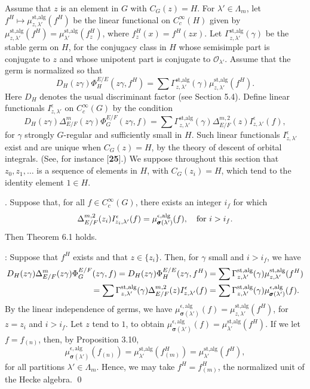\documentclass{amsart}
\begin{document}
Assume that $z$ is an element in $G$ with $C_G(z) = H$.  For $\lambda'\in\Lambda_m$,
let $f^H\mapsto \mu_{z,\lambda'}^{\text{st,alg}}(f^H)$ be the linear
functional on $C_c^\infty(H)$ given by 
	$\mu_{z,\lambda'}^{\text{st,alg}}(f^H)=
\mu_{\lambda'}^{\text{st,alg}}(f^H_z)$, where $f^H_z(x) = f^H(zx)$.
Let $\Gamma^{\text{st,alg}}_{z,\lambda'}(\gamma)$ be the stable germ
on $H$, for the conjugacy class in $H$ whose semisimple part is
conjugate to $z$ and whose unipotent part is conjugate
to ${\mathcal O}_{\lambda'}$.  Assume that the germ is normalized
so that
$$D_H(z\gamma)\Phi^{E/E}_H(z\gamma,f^H) = \sum \Gamma^{\text{st,alg}}_{z,\lambda'}
(\gamma)\mu_{z,\lambda'}^{\text{st,alg}}(f^H).$$
Here $D_H$ denotes the usual discriminant factor (see Section 5.4).
Define linear functionals $I^{\epsilon}_{z,\lambda'}$ on 
$C_c^\infty(G)$ by the condition
$$D_H(z\gamma)\Delta^m_{E/F}(z\gamma)\Phi^{E/F}_G(z\gamma,f) = 
	\sum\Gamma^{\text{st,alg}}_{z,\lambda'}(\gamma)\Delta^{m,2}_{E/F}(z)
	I^{\epsilon}_{z,\lambda'}(f),$$
for $\gamma$ strongly $G$-regular and sufficiently small in $H$.
Such linear functionals $I^{\epsilon}_{z,\lambda'}$ exist
and are unique when $C_G(z) = H$, by the theory of descent of
orbital integrals.  (See, for instance [{\bf 25}].)
We suppose throughout this section that $z_0,z_1,\ldots$ is a sequence
of elements in $H$, with $C_G(z_i) = H$, which tend to the identity
element $1\in H$.  

.  
Suppose that, for all $f\in C_c^\infty (G)$, there exists
an integer $i_f$ for which
$$\Delta^{m,2}_{E/F}(z_i)I^{\epsilon}_{z_i,\lambda'}(f)
	= \mu^{\epsilon,\text{alg}}_{\pmb\sigma(\lambda')}(f),\ \ \text{ for }
	i>i_f.\hss$$
Then Theorem 6.1 holds.
\finishproclaim

:  Suppose that $f^H$ exists and that $z\in \{z_i\}$.
Then, for $\gamma$ small and $i>i_f$, we have
\begin{align*}
D_H(z\gamma)\Delta^m_{E/F}(z\gamma)\Phi^{E/F}_G(z\gamma,f) =
	D_H(z\gamma)\Phi^{E/E}_H(z\gamma,f^H) &= 
 	\sum\Gamma^{\text{st,alg}}_{z,\lambda'}(\gamma)\mu^{\text{st,alg}}_
	{z,\lambda'}(f^H)\\
	\vspace{8pt}
	= \sum\Gamma^{\text{st,alg}}_{z,\lambda'}(\gamma)
	\Delta^{m,2}_{E/F}(z)
	I^{\epsilon}_{z,\lambda'}(f) &= \sum\Gamma^{\text{st,alg}}_
	{z,\lambda'}(\gamma)\mu^{\epsilon,\text{alg}}_{\pmb\sigma(\lambda')}
	(f).
\end{align*}
By the linear independence of germs, we have  $\mu^{\epsilon,\text{alg}}_%
	{\pmb\sigma(\lambda')}(f)
	=\mu^{\text{st,alg}}_{z,\lambda'}(f^H)$, for $z=z_i$ and $i>i_f$.
Let $z$ tend to $1$, to obtain $\mu^{\epsilon,{\text{alg}}}_{\pmb\sigma(\lambda')}
(f) = \mu^{\text{st,alg}}_{\lambda'}(f^H)$.  If we let $f=f_{(n)}$,
then, by Proposition 3.10,
$$\mu^{\epsilon,{\text{alg}}}_{\pmb\sigma(\lambda')}(f_{(n)}) =
  \mu^{\text{st,alg}}_{\lambda'}(f^H_{(m)}) = 
  \mu^{\text{st,alg}}_{\lambda'}(f^H),$$
for all partitions $\lambda'\in \Lambda_m$.  Hence, we may
take $f^H = f^H_{(m)}$, the normalized unit of the Hecke algebra.
\qed
\finishproclaim
\end{document}
